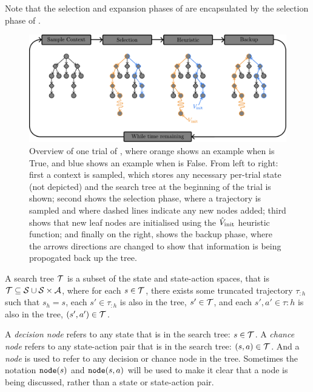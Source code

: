         Note that the selection and expansion phases of \mctsone are encapsulated by the selection phase of \thtspp.

        \begin{figure}
            \centering\includegraphics[width=1.0\textwidth]{figures/ch2/thts_trial.pdf} 
            \caption[Overview of one trial of \thtspp.]{Overview of one trial of \thtspp, where orange shows an example when \mctsmode\ewe is True, and blue shows an example when \mctsmode\ewe is False. From left to right: first a context is sampled, which stores any necessary per-trial state (not depicted) and the search tree at the beginning of the trial is shown; second shows the selection phase, where a trajectory is sampled and where dashed lines indicate any new nodes added; third shows that new leaf nodes are initialised using the ${\hat{V}_{\textnormal{init}}}$ heuristic function; and finally on the right, shows the backup phase, where the arrows directions are changed to show that information is being propogated back up the tree.}
            \label{fig:thts}
        \end{figure}

        \begin{defn}
            \label{def:search_tree}
            A \textnormal{search tree} $\mathcal{T}$ is a subset of the state and state-action spaces, that is $\mathcal{T}\subseteq \mathcal{S} \cup \mathcal{S} \times \mathcal{A}$, where for each $s\in\mathcal{T}$, there exists some truncated trajectory $\tau_{:h}$ such that $s_h = s$, each $s'\in\tau_{:h}$ is also in the tree, $s'\in\mathcal{T}$, and each $s',a'\in\tau{:h}$ is also in the tree, $(s',a')\in\mathcal{T}$.
        \end{defn}

            A \textit{decision node} refers to any state that is in the search tree: $s\in\mathcal{T}$. A \textit{chance node} refers to any state-action pair that is in the search tree: $(s,a)\in\mathcal{T}$. And a \textit{node} is used to refer to any decision or chance node in the tree. Sometimes the notation ${\textnormal{\texttt{node}}}(s)$ and ${\textnormal{\texttt{node}}}(s,a)$ will be used to make it clear that a node is being discussed, rather than a state or state-action pair.

